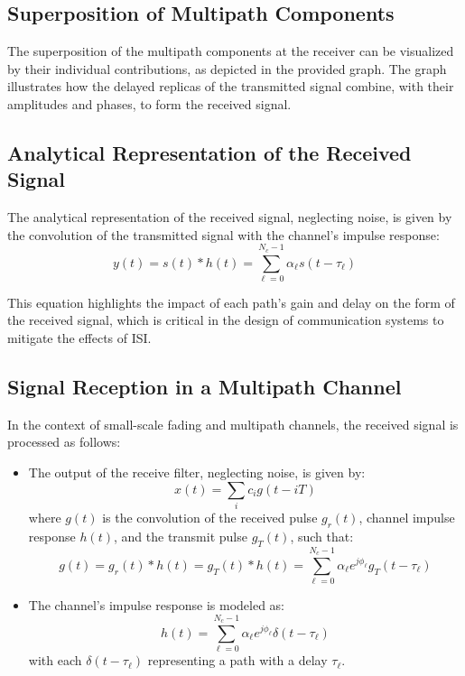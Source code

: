 \subsection*{Superposition of Multipath Components}

The superposition of the multipath components at the receiver can be visualized by their individual contributions, as depicted in the provided graph. The graph illustrates how the delayed replicas of the transmitted signal combine, with their amplitudes and phases, to form the received signal.
\subsection*{Analytical Representation of the Received Signal}

The analytical representation of the received signal, neglecting noise, is given by the convolution of the transmitted signal with the channel's impulse response:
\begin{equation}
    y(t) = s(t) \ast h(t) = \sum_{\ell=0}^{N_c-1} \alpha_{\ell} s(t - \tau_{\ell})
\end{equation}

This equation highlights the impact of each path's gain and delay on the form of the received signal, which is critical in the design of communication systems to mitigate the effects of ISI.


\subsection*{Signal Reception in a Multipath Channel}

In the context of small-scale fading and multipath channels, the received signal is processed as follows:

\begin{itemize}
    \item The output of the receive filter, neglecting noise, is given by:
    \[
    x(t) = \sum_{i} c_i g(t - iT)
    \]
    where \( g(t) \) is the convolution of the received pulse \( g_r(t) \), channel impulse response \( h(t) \), and the transmit pulse \( g_T(t) \), such that:
    \[
    g(t) = g_r(t) \ast h(t) = g_T(t) \ast h(t) = \sum_{\ell=0}^{N_c-1} \alpha_{\ell} e^{j\phi_{\ell}} g_T(t - \tau_{\ell})
    \]
    
    \item The channel's impulse response is modeled as:
    \[
    h(t) = \sum_{\ell=0}^{N_c-1} \alpha_{\ell} e^{j\phi_{\ell}} \delta(t - \tau_{\ell})
    \]
    with each \( \delta(t - \tau_{\ell}) \) representing a path with a delay \( \tau_{\ell} \).
\end{itemize}

